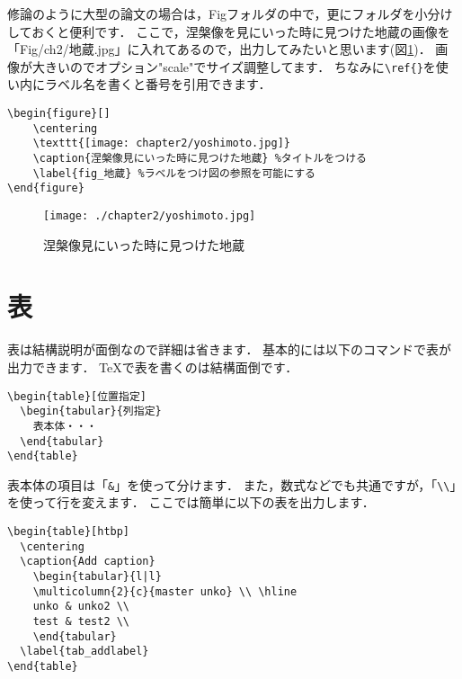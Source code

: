 修論のように大型の論文の場合は，Figフォルダの中で，更にフォルダを小分けしておくと便利です．
ここで，涅槃像を見にいった時に見つけた地蔵の画像を「Fig/ch2/地蔵.jpg」に入れてあるので，出力してみたいと思います(図\ref{fig_地蔵})．
画像が大きいのでオプション"scale"でサイズ調整してます．
ちなみに\verb|\ref{}|を使い{}内にラベル名を書くと番号を引用できます．

\begin{verbatim}
\begin{figure}[]
    \centering
    \texttt{[image: chapter2/yoshimoto.jpg]}
    \caption{涅槃像見にいった時に見つけた地蔵} %タイトルをつける
    \label{fig_地蔵} %ラベルをつけ図の参照を可能にする
\end{figure}
\end{verbatim}

\begin{figure}[]
  \begin{center}
    \texttt{[image: ./chapter2/yoshimoto.jpg]}
    \caption{涅槃像見にいった時に見つけた地蔵}
    \label{fig_地蔵}
  \end{center}
\end{figure}

\section{表}
表は結構説明が面倒なので詳細は省きます．
基本的には以下のコマンドで表が出力できます．
TeXで表を書くのは結構面倒です．
\begin{verbatim}
\begin{table}[位置指定]
  \begin{tabular}{列指定}
    表本体・・・
  \end{tabular}
\end{table}
\end{verbatim}

表本体の項目は「\verb|&|」を使って分けます．
また，数式などでも共通ですが，「\verb|\\|」を使って行を変えます．
ここでは簡単に以下の表を出力します．
\begin{verbatim}
\begin{table}[htbp]
  \centering
  \caption{Add caption}
    \begin{tabular}{l|l}
    \multicolumn{2}{c}{master unko} \\ \hline
    unko & unko2 \\
    test & test2 \\
    \end{tabular}
  \label{tab_addlabel}
\end{table}
\end{verbatim}

